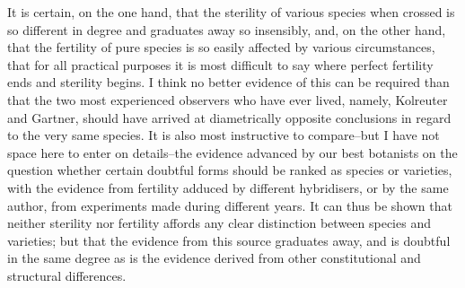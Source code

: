 It is certain, on the one hand, that the sterility of various species when crossed is so different in degree and graduates away so insensibly, and, on the other hand, that the fertility of pure species is so easily affected by various circumstances, that for all practical purposes it is most difficult to say where perfect fertility ends and sterility begins. I think no better evidence of this can be required than that the two most experienced observers who have ever lived, namely, Kolreuter and Gartner, should have arrived at diametrically opposite conclusions in regard to the very same species. It is also most instructive to compare--but I have not space here to enter on details--the evidence advanced by our best botanists on the question whether certain doubtful forms should be ranked as species or varieties, with the evidence from fertility adduced by different hybridisers, or by the same author, from experiments made during different years. It can thus be shown that neither sterility nor fertility affords any clear distinction between species and varieties; but that the evidence from this source graduates away, and is doubtful in the same degree as is the evidence derived from other constitutional and structural differences.
